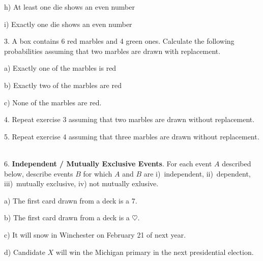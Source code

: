 \documentclass[10pt]{article}
\begin{document}
\hspace{20pt} h) At least one die shows an even number
\bigskip\medskip

\hspace{20pt} i) Exactly one die shows an even number
\bigskip\medskip

3. A box contains 6 red marbles and 4 green ones.  Calculate the following probabilities
assuming that two marbles are drawn with replacement.
\medskip

\hspace{20pt} a) Exactly one of the marbles is red
\medskip\bigskip\bigskip

\hspace{20pt} b) Exactly two of the marbles are red
\medskip\bigskip\bigskip

\hspace{20pt} c) None of the marbles are red.
\medskip\bigskip\bigskip

4. Repeat exercise 3 assuming that two marbles are drawn without replacement.
\vspace{.7in}

5. Repeat exercise 4 assuming that three marbles are drawn without replacement.
\vfill
\eject
{\ }

6. \textbf{Independent / Mutually Exclusive Events}. 
For each event $A$ described below, describe events $B$ for which
$A$ and $B$ are
i)~independent, ii)~dependent,
iii)~mutually exclusive, iv) not mutually exlusive.
\medskip

\hspace{20pt} a) The first card drawn from a deck is a 7.
\vspace{1.75in}

\hspace{20pt} b) The first card drawn from a deck is a $\heartsuit$.
\vspace{1.75in}

\hspace{20pt} c) It will snow in Winchester on February 21 of next year.
\vspace{1.75in}

\hspace{20pt} d) Candidate $X$  will win the Michigan primary in the next presidential election.
\vspace{1.75in}




\vfill
\eject
\end{document}

